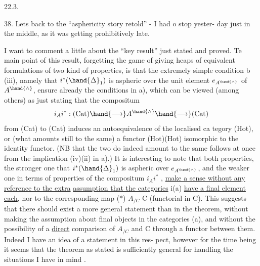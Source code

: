 
22.3.

38. Lets  back to the ``asphericity story retold'' - I had o stop yester-%
day just in the middle, as it was getting prohibitively late.

I want to comment a little about the ``key result'' just stated and
proved. Te main point of this result, forgetting the game of giving
heaps of equivalent formulations of two kind of properties, is that the
extremely simple condition b (iii), namely that $i^{*}(\hand{\ensuremath{\Delta}}_1)$ is aspheric over
the unit element $e_{A^{\hand{\wedge}}}$ of $A^{\hand{\wedge}}$, ensure already the conditions in a), which
can be viewed (among others) as just stating that the compositum
\[ i_A i^{*} : \text{(Cat)} \hand{\ensuremath{\longrightarrow}} A^{\hand{\wedge}} \hand{\ensuremath{\longrightarrow}} \text{(Cat)} \]
 from (Cat) to (Cat) induces an autoequivalence of the localised ca%
tegory (Hot), or (what amounts still to the same) a functor (Hot)\hand{\ensuremath{\to}}(Hot)
 isomorphic to the identity functor. (NB that the two do indeed amount
to the same follows at once from the implication (iv)\hand{\ensuremath{\Rightarrow}}(ii) in a).) It
is interesting to note that both properties, the stronger one that
$i^{*}(\hand{\ensuremath{\Delta}}_1)$ is aspheric over $e_{A^{\hand{\wedge}}}$, and the weaker one in terms of properties
of the compositum $i_A i^{*}$ , \uline{make a sense without any reference to the extra}
\uline{assumption that the categories} i(a) \uline{have a final element each}, nor to the
corresponding map ($*$) $A_{/C}$ \hand{\ensuremath{\to}} C (functorial in C). This suggests that
there should exist a more general statement than in the theorem, without
making the assumption about final objects in the categories (a), and
without the possibility of a \uline{direct} comparison of $A_{/C}$ and C through a
functor between them. Indeed I have an idea of a statement in this res-%
 pect, however for the time being it seems that the theorem as stated is
sufficiently general for handling the situations I have in mind .

